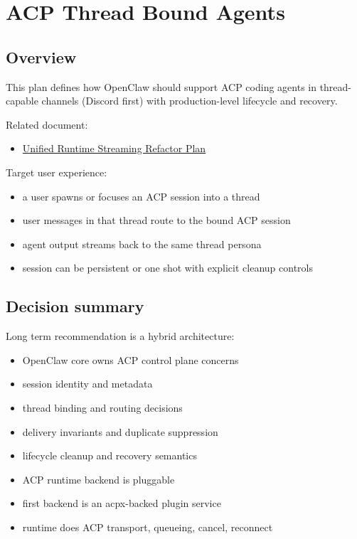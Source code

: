 \clearpage
\section{ACP Thread Bound Agents}


\subsection{Overview}


This plan defines how OpenClaw should support ACP coding agents in thread-capable channels (Discord first) with production-level lifecycle and recovery.

Related document:

\begin{itemize}
  \item \href{/experiments/plans/acp-unified-streaming-refactor}{Unified Runtime Streaming Refactor Plan}
\end{itemize}


Target user experience:

\begin{itemize}
  \item a user spawns or focuses an ACP session into a thread
  \item user messages in that thread route to the bound ACP session
  \item agent output streams back to the same thread persona
  \item session can be persistent or one shot with explicit cleanup controls
\end{itemize}


\subsection{Decision summary}


Long term recommendation is a hybrid architecture:

\begin{itemize}
  \item OpenClaw core owns ACP control plane concerns
  \item session identity and metadata
  \item thread binding and routing decisions
  \item delivery invariants and duplicate suppression
  \item lifecycle cleanup and recovery semantics
  \item ACP runtime backend is pluggable
  \item first backend is an acpx-backed plugin service
  \item runtime does ACP transport, queueing, cancel, reconnect
\end{itemize}


